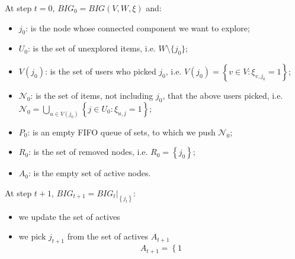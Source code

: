 \begin{defn}\label{defn:gep}
    At step $t=0$, $BIG_0=BIG(V,W,\xi)$ and:
    \begin{itemize}
        \item $j_0$: is the node whose connected component we want to explore;
        \item $U_0$: is the set of unexplored items, i.e. $W\setminus \{j_0\}$;
        \item $V(j_0)$: is the set of users who picked $j_0$, i.e. $\displaystyle V(j_0) = \left\{ v \in V \colon \xi_{v,j_0}=1 \right\}$;
        \item $\mathcal{N}_0$: is the set of items, not including $j_0$, that the above users picked, i.e. $\mathcal{N}_0 = \displaystyle \bigcup_{u \in V(j_0)} \left\{ j \in U_0 \colon \xi_{u,j}=1 \right\}$;
        \item $P_0$: is an empty FIFO queue of sets, to which we push $\mathcal{N}_0$;
        \item $R_0$: is the set of removed nodes, i.e. $R_0 = \left\{ j_0 \right\}$;
        \item $A_0$: is the empty set of active nodes.
    \end{itemize}
    At step $t+1$, $\displaystyle BIG_{t+1} = BIG_t|_{\left\{ j_t \right\}}$:
    \begin{itemize}
        \item we update the set of actives
        \item we pick $j_{t+1}$ from the set of actives $A_{t+1}$ \[A_{t+1} = \left\{ 1 \right.\]
    \end{itemize}
\end{defn}
